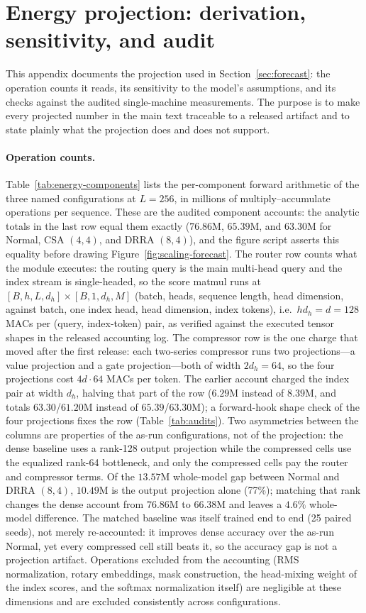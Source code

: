 \section{Energy projection: derivation, sensitivity, and audit}
\label{sec:appendix-energy}

This appendix documents the projection used in Section~\ref{sec:forecast}:
the operation counts it reads, its sensitivity to the
model's assumptions, and its checks against the audited single-machine
measurements. The purpose is to make every projected number in the main
text traceable to a released artifact and to state plainly what the
projection does and does not support.

\paragraph{Operation counts.} Table~\ref{tab:energy-components} lists the
per-component forward arithmetic of the three named configurations at
$L{=}256$, in millions of multiply--accumulate operations per sequence.
These are the audited component accounts: the analytic totals in the last
row equal them exactly ($76.86$M, $65.39$M, and $63.30$M for
Normal, CSA $(4,4)$, and DRRA $(8,4)$), and the figure script asserts this
equality before drawing Figure~\ref{fig:scaling-forecast}. The router row
counts what the module executes: the routing query is the main multi-head
query and the index stream is single-headed, so the score matmul runs at
$[B, h, L, d_h] \times [B, 1, d_h, M]$ (batch, heads, sequence length, head
dimension, against batch, one index head, head dimension, index tokens),
i.e.\ $h d_h = d = 128$ MACs per
(query, index-token) pair, as verified against the executed tensor shapes
in the released accounting log. The compressor row is the one charge that
moved after the first release: each two-series compressor runs two
projections---a value projection and a gate projection---both of width
$2d_h{=}64$, so the four projections cost $4d\cdot 64$ MACs per token. The
earlier account charged the index pair at width $d_h$, halving that part of
the row ($6.29$M instead of $8.39$M, and totals $63.30$/$61.20$M instead of
$65.39$/$63.30$M); a forward-hook shape check of the four projections fixes
the row (Table~\ref{tab:audits}). Two asymmetries
between the columns are properties of the as-run configurations, not of
the projection: the dense baseline uses a rank-128 output projection while
the compressed cells use the equalized rank-64 bottleneck, and only the
compressed cells pay the router and compressor terms. Of the $13.57$M
whole-model gap between Normal and DRRA $(8,4)$, $10.49$M is the output
projection alone (77\%); matching that rank changes the dense account from $76.86$M to
$66.38$M and leaves a $4.6\%$ whole-model
difference. The matched baseline was itself trained end to end (25 paired seeds), not
merely re-accounted: it improves dense accuracy over the as-run Normal, yet
every compressed cell still beats it, so the accuracy gap is not a projection
artifact. Operations excluded
from the accounting (RMS normalization, rotary embeddings, mask
construction, the head-mixing weight of the index scores, and the softmax
normalization itself) are negligible at
these dimensions and are excluded consistently across configurations.

